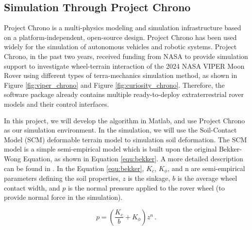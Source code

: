 \documentclass{article}
\begin{document}
\subsection{Simulation Through Project Chrono}
Project Chrono is a multi-physics modeling and simulation infrastructure based on a platform-independent, open-source design. Project Chrono has been used widely for the simulation of autonomous vehicles and robotic systems. Project Chrono, in the past two years, received funding from NASA to provide simulation support to investigate wheel-terrain interaction of the 2024 NASA VIPER Moon Rover using different types of terra-mechanics simulation method, as shown in Figure \ref{fig:viper_chrono} and Figure \ref{fig:curiosity_chrono}. Therefore, the software package already contains multiple ready-to-deploy extraterrestrial rover models and their control interfaces. 

In this project, we will develop the algorithm in Matlab, and use Project Chrono as our simulation environment. In the simulation, we will use the Soil-Contact Model (SCM) deformable terrain model to simulation soil deformation. The SCM model is a simple semi-empirical model which is built upon the original Bekker-Wong Equation, as shown in Equation \ref{equ:bekker}. A more detailed description can be found in \cite{10.1115/1.4056851}. In the Equation \ref{equ:bekker}, \(K_{c}\), \(K_{\phi}\), and n are semi-empirical parameters defining the soil properties, \(z\) is the sinkage, \(b\) is the average wheel contact width, and \(p\) is the normal pressure applied to the rover wheel (to provide normal force in the simulation).

\begin{equation}\label{equ:bekker}
	p = \left( \frac{K_c}{b} + K_\phi \right) z^n \, .
\end{equation}
\end{document}
